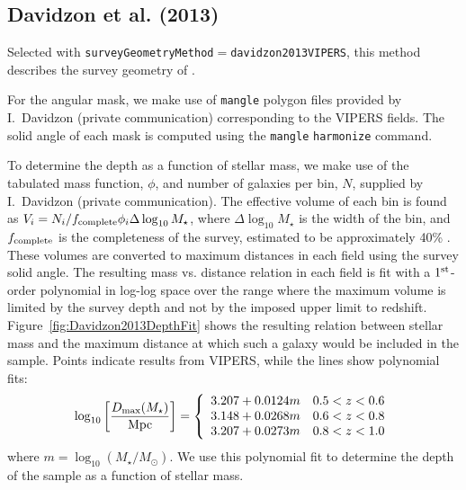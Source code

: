\subsection{Davidzon et al. (2013)}\label{phys:surveyGeometry:surveyGeometryDavidzon2013VIPERS}

Selected with {\tt surveyGeometryMethod}$=${\tt davidzon2013VIPERS}, this method describes the survey geometry of \cite{davidzon_vimos_2013}. 

For the angular mask, we make use of {\tt mangle} polygon files provided by I.~Davidzon (private communication) corresponding to the VIPERS fields. The solid angle of each mask is computed using the {\tt mangle} {\tt harmonize} command.

To determine the depth as a function of stellar mass, we make use of the tabulated mass function, $\phi$, and number of galaxies per bin, $N$, supplied by I.~Davidzon (private communication). The effective volume of each bin is found as $V_i = N_i/f_{\rm complete}\phi_i\Delta\log_{10}M_\star$, where $\Delta\log_{10}M_\star$ is the width of the bin, and $f_{\rm complete}$ is the completeness of the survey, estimated to be approximately 40\% \citep{guzzo_vimos_2013}. These volumes are converted to maximum distances in each field using the survey solid angle. The resulting mass vs. distance relation in each field is fit with a $1^{\rm st}$-order polynomial in log-log space over the range where the maximum volume is limited by the survey depth and not by the imposed upper limit to redshift. Figure~\ref{fig:Davidzon2013DepthFit} shows the resulting relation between stellar mass and the maximum distance at which such a galaxy would be included in the sample. Points indicate results from VIPERS, while the lines show polynomial fits:
\begin{equation}
 \log_{10} \left[ {D_{\rm max}(M_\star) \over \hbox{Mpc}}\right] = \left\{ \begin{array}{ll} 3.207 + 0.0124m & 0.5 < z < 0.6 \\ 3.148 + 0.0268m & 0.6 < z < 0.8  \\ 3.207 + 0.0273m & 0.8 < z < 1.0 \end{array} \right.
 \label{eq:DavidzonDepthPolynomial}
\end{equation}
where $m= \log_{10}(M_\star/M_\odot)$. We use this polynomial fit to determine the depth of the sample as a function of stellar mass.

